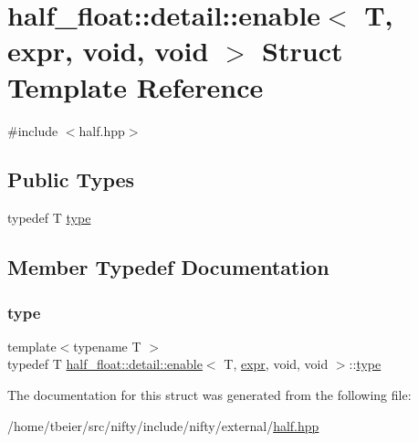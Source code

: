 \hypertarget{structhalf__float_1_1detail_1_1enable_3_01T_00_01expr_00_01void_00_01void_01_4}{}\section{half\+\_\+float\+:\+:detail\+:\+:enable$<$ T, expr, void, void $>$ Struct Template Reference}
\label{structhalf__float_1_1detail_1_1enable_3_01T_00_01expr_00_01void_00_01void_01_4}


{\ttfamily \#include $<$half.\+hpp$>$}

\subsection*{Public Types}
\begin{DoxyCompactItemize}
\item 
typedef T \hyperlink{structhalf__float_1_1detail_1_1enable_3_01T_00_01expr_00_01void_00_01void_01_4_a304f0491d60b73a0be25ff00b24e3bc0}{type}
\end{DoxyCompactItemize}


\subsection{Member Typedef Documentation}
\mbox{\label{structhalf__float_1_1detail_1_1enable_3_01T_00_01expr_00_01void_00_01void_01_4_a304f0491d60b73a0be25ff00b24e3bc0}} 
\subsubsection{\texorpdfstring{type}{type}}
{\footnotesize\ttfamily template$<$typename T $>$ \\
typedef T \hyperlink{structhalf__float_1_1detail_1_1enable}{half\+\_\+float\+::detail\+::enable}$<$ T, \hyperlink{structhalf__float_1_1detail_1_1expr}{expr}, void, void $>$\+::\hyperlink{structhalf__float_1_1detail_1_1enable_3_01T_00_01expr_00_01void_00_01void_01_4_a304f0491d60b73a0be25ff00b24e3bc0}{type}}



The documentation for this struct was generated from the following file\+:\begin{DoxyCompactItemize}
\item 
/home/tbeier/src/nifty/include/nifty/external/\hyperlink{half_8hpp}{half.\+hpp}\end{DoxyCompactItemize}
